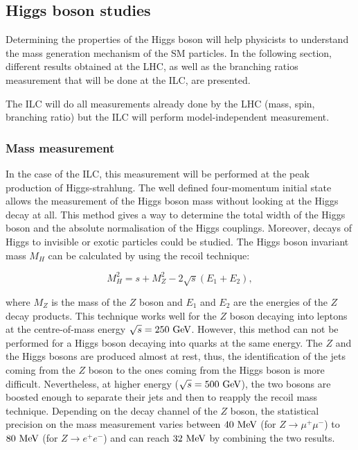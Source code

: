     \subsection{Higgs boson studies}
    
    Determining the properties of the Higgs boson will help physicists to understand the mass generation mechanism of the \gls{SM} particles.
    In the following section, different results obtained at the \gls{LHC}, as well as the branching ratios measurement that will be done at the \gls{ILC}, are presented.

    The \gls{ILC} will do all measurements already done by the \gls{LHC} (mass, spin, branching ratio) but the \gls{ILC} will perform model-independent measurement.

    \subsubsection{Mass measurement}
    \label{sec:massRecoil}

    In the case of the \gls{ILC}, this measurement will be performed at the peak production of Higgs-strahlung.
    The well defined four-momentum initial state allows the measurement of the Higgs boson mass without looking at the Higgs decay at all.
    This method gives a way to determine the total width of the Higgs boson and the absolute normalisation of the Higgs couplings.
    Moreover, decays of Higgs to invisible or exotic particles could be studied.
    The Higgs boson invariant mass $M_H$ can be calculated by using the recoil technique:

    \begin{equation}
      M^2_H = s + M^2_Z - 2 \sqrt{s}\left(E_{1} + E_{2}\right),
    \end{equation}

    where $M_Z$ is the mass of the $Z$ boson and $E_1$ and $E_2$ are the energies of the $Z$ decay products. 
    This technique works well for the $Z$ boson decaying into leptons at the centre-of-mass energy $\sqrt{s} = 250~\rm{GeV}$.
    However, this method can not be performed for a Higgs boson decaying into quarks at the same energy. 
    The $Z$ and the Higgs bosons are produced almost at rest, thus, the identification of the jets coming from the $Z$ boson to the ones coming from the Higgs boson is more difficult.
    Nevertheless, at higher energy ($\sqrt{s} = 500~\rm{GeV}$), the two bosons are boosted enough to separate their jets and then to reapply the recoil mass technique.
    Depending on the decay channel of the $Z$ boson, the statistical precision on the mass measurement varies between $40~\rm{MeV}$ (for $Z \rightarrow \mu^+\mu^-$) to $80~\rm{MeV}$ (for $Z \rightarrow e^+e^-$) and can reach $32~\rm{MeV}$ by combining the two results.

